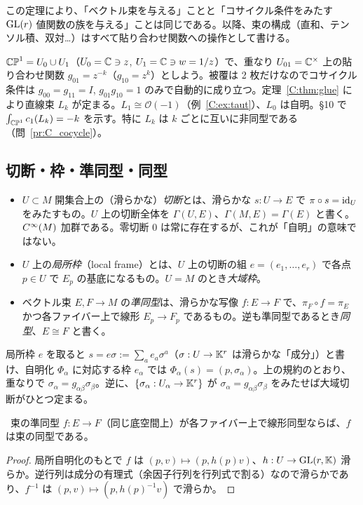 この定理により、「ベクトル束を与える」ことと「コサイクル条件をみたす $\mathrm{GL}(r)$ 値関数の族を与える」ことは同じである。以降、束の構成（直和、テンソル積、双対…）はすべて貼り合わせ関数への操作として書ける。

\begin{ex}[$\CP^1$ 上の直線束 $L_k$]\label{C:ex:Lk}
$\mathbb{CP}^1=U_0\cup U_1$（$U_0=\mathbb C\ni z$, $U_1=\mathbb C\ni w=1/z$）で、重なり $U_{01}=\mathbb C^\times$ 上の貼り合わせ関数 $g_{01}=z^{-k}$（$g_{10}=z^k$）としよう。被覆は 2 枚だけなのでコサイクル条件は $g_{00}=g_{11}=I$, $g_{01}g_{10}=1$ のみで自動的に成り立つ。定理~\ref{C:thm:glue} により直線束 $L_k$ が定まる。$L_1\cong\mathcal O(-1)$（例~\ref{C:ex:taut}）、$L_0$ は自明。§10 で $\int_{\mathbb{CP}^1}c_1(L_k)=-k$ を示す。特に $L_k$ は $k$ ごとに互いに非同型である（問~\ref{pr:C_cocycle}）。
\end{ex}

\subsection{切断・枠・準同型・同型}
\begin{defn}[切断・枠・準同型]\label{C:def:sec}
\begin{itemize}
\item $U\subset M$ 開集合上の（滑らかな）\emph{切断}とは、滑らかな $s:U\to E$ で $\pi\circ s=\mathrm{id}_U$ をみたすもの。$U$ 上の切断全体を $\Gamma(U,E)$、$\Gamma(M,E)=\Gamma(E)$ と書く。$C^\infty(M)$ 加群である。零切断 $0$ は常に存在するが、これが「自明」の意味ではない。
\item $U$ 上の\emph{局所枠}（local frame）とは、$U$ 上の切断の組 $e=(e_1,\dots,e_r)$ で各点 $p\in U$ で $E_p$ の基底になるもの。$U=M$ のとき\emph{大域枠}。
\item ベクトル束 $E,F\to M$ の\emph{準同型}は、滑らかな写像 $f:E\to F$ で、$\pi_F\circ f=\pi_E$ かつ各ファイバー上で線形 $E_p\to F_p$ であるもの。逆も準同型であるとき\emph{同型}、$E\cong F$ と書く。
\end{itemize}
\end{defn}
局所枠 $e$ を取ると $s=e\sigma:=\sum_ae_a\sigma^a$（$\sigma:U\to\mathbb K^r$ は滑らかな「成分」）と書け、自明化 $\Phi_\alpha$ に対応する枠 $e_\alpha$ では $\Phi_\alpha(s)=(p,\sigma_\alpha)$。上の規約のとおり、重なりで $\sigma_\alpha=g_{\alpha\beta}\sigma_\beta$。逆に、$\{\sigma_\alpha:U_\alpha\to\mathbb K^r\}$ が $\sigma_\alpha=g_{\alpha\beta}\sigma_\beta$ をみたせば大域切断がひとつ定まる。

\begin{lem}\label{C:lem:iso}\tP\
束の準同型 $f:E\to F$（同じ底空間上）が各ファイバー上で線形同型ならば、$f$ は束の同型である。
\end{lem}
\begin{proof}
局所自明化のもとで $f$ は $(p,v)\mapsto(p,h(p)v)$、$h:U\to\mathrm{GL}(r,\mathbb K)$ 滑らか。逆行列は成分の有理式（余因子行列を行列式で割る）なので滑らかであり、$f^{-1}$ は $(p,v)\mapsto(p,h(p)^{-1}v)$ で滑らか。
\end{proof}

